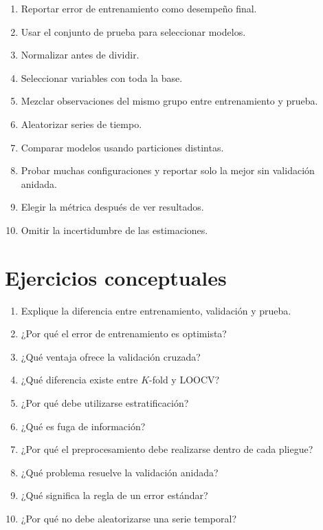 \documentclass[
  spanish,
  11pt,
  letterpaper,
  DIV=11,
  numbers=noendperiod]{scrreprt}
\providecommand{\tightlist}{%
  \setlength{\itemsep}{0pt}\setlength{\parskip}{0pt}}
\theoremstyle{definition}
\theoremstyle{plain}
\theoremstyle{definition}
\theoremstyle{remark}
\begin{document}
\begin{enumerate}
\def\labelenumi{\arabic{enumi}.}
\tightlist
\item
  Reportar error de entrenamiento como desempeño final.
\item
  Usar el conjunto de prueba para seleccionar modelos.
\item
  Normalizar antes de dividir.
\item
  Seleccionar variables con toda la base.
\item
  Mezclar observaciones del mismo grupo entre entrenamiento y prueba.
\item
  Aleatorizar series de tiempo.
\item
  Comparar modelos usando particiones distintas.
\item
  Probar muchas configuraciones y reportar solo la mejor sin validación
  anidada.
\item
  Elegir la métrica después de ver resultados.
\item
  Omitir la incertidumbre de las estimaciones.
\end{enumerate}

\section{Ejercicios conceptuales}\label{ejercicios-conceptuales-6}

\begin{enumerate}
\def\labelenumi{\arabic{enumi}.}
\tightlist
\item
  Explique la diferencia entre entrenamiento, validación y prueba.
\item
  ¿Por qué el error de entrenamiento es optimista?
\item
  ¿Qué ventaja ofrece la validación cruzada?
\item
  ¿Qué diferencia existe entre \(K\)-fold y LOOCV?
\item
  ¿Por qué debe utilizarse estratificación?
\item
  ¿Qué es fuga de información?
\item
  ¿Por qué el preprocesamiento debe realizarse dentro de cada pliegue?
\item
  ¿Qué problema resuelve la validación anidada?
\item
  ¿Qué significa la regla de un error estándar?
\item
  ¿Por qué no debe aleatorizarse una serie temporal?
\end{enumerate}
\end{document}
